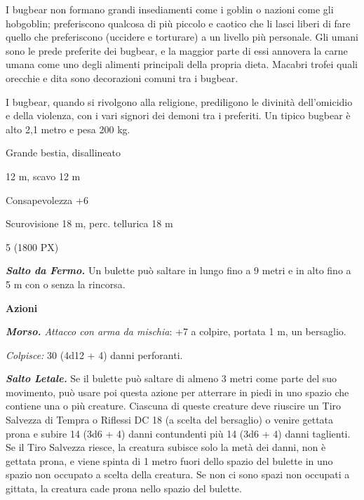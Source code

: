 \begin{multicols}{2}
{I bugbear non formano grandi insediamenti come i goblin o nazioni come gli hobgoblin; preferiscono qualcosa di più piccolo e caotico che li lasci liberi di fare quello che preferiscono (uccidere e torturare) a un livello più personale. Gli umani sono le prede preferite dei bugbear, e la maggior parte di essi annovera la carne umana come uno degli alimenti principali della propria dieta. Macabri trofei quali orecchie e dita sono decorazioni comuni tra i bugbear.

I bugbear, quando si rivolgono alla religione, prediligono le divinità dell'omicidio e della violenza, con i vari signori dei demoni tra i preferiti. Un tipico bugbear è alto 2,1 metro e pesa 200 kg.

\begin{description}[noitemsep, topsep=0pt, parsep=0pt, partopsep=0pt, itemsep=1pt, leftmargin=2.35cm,  labelwidth=2.2cm, itemindent=0cm, listparindent=0pt] %
\setlength{\baselineskip}{10pt}
\item[\textbf{Taglia/Tipo}] Grande bestia, disallineato
\item[\textbf{Caratt.}] 
\item[\textbf{Punti Ferita}] 
\item[\textbf{Movimento}] 12 m, scavo 12 m
\item[\textbf{Tiri Salvez.}] 
\item[\textbf{Comp.}] Consapevolezza +6
\item[\textbf{Sensi}] Scurovisione 18 m, perc. tellurica 18 m
\item[\textbf{Sfida}] 5 (1800 PX)
\end{description}
\smallskip

\emph{\textbf{Salto da Fermo.}} Un bulette può saltare in lungo fino a 9 metri e in alto fino a 5 m con o senza la rincorsa.

\textbf{Azioni}

\emph{\textbf{Morso.} Attacco con arma da mischia}: +7 a colpire, portata 1 m, un bersaglio.

\emph{Colpisce:} 30 (4d12 + 4) danni perforanti.

\emph{\textbf{Salto Letale.}} Se il bulette può saltare di almeno 3 metri come parte del suo movimento, può usare poi questa azione per atterrare in piedi in uno spazio che contiene una o più creature. Ciascuna di queste creature deve riuscire un Tiro Salvezza di Tempra o Riflessi DC 18 (a scelta del bersaglio) o venire gettata prona e subire 14 (3d6 + 4) danni contundenti più 14 (3d6 + 4) danni taglienti. Se il Tiro Salvezza riesce, la creatura subisce solo la metà dei danni, non è gettata prona, e viene spinta di 1 metro fuori dello spazio del bulette in uno spazio non occupato a scelta della creatura. Se non ci sono spazi non occupati a gittata, la creatura cade prona nello spazio del bulette.

}
\end{multicols}
